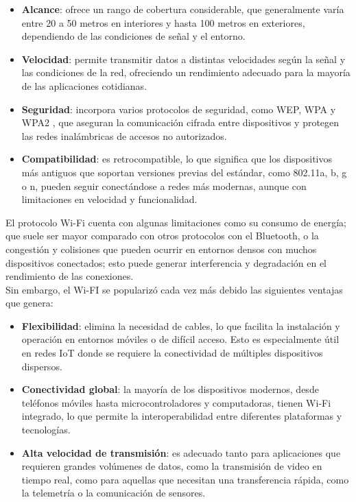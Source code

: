 \begin{itemize}
    \item \textbf{Alcance}: ofrece un rango de cobertura considerable, que generalmente varía entre 20 a 50 metros en interiores y hasta 100 metros en exteriores, dependiendo de las condiciones de señal y el entorno.
    
    \item \textbf{Velocidad}: permite transmitir datos a distintas velocidades según la señal y las condiciones de la red, ofreciendo un rendimiento adecuado para la mayoría de las aplicaciones cotidianas.
    
    \item \textbf{Seguridad}: incorpora varios protocolos de seguridad, como WEP, WPA y WPA2 \cite{wifi_security}, que aseguran la comunicación cifrada entre dispositivos y protegen las redes inalámbricas de accesos no autorizados.
    
    \item \textbf{Compatibilidad}: es retrocompatible, lo que significa que los dispositivos más antiguos que soportan versiones previas del estándar, como 802.11a, b, g o n, pueden seguir conectándose a redes más modernas, aunque con limitaciones en velocidad y funcionalidad.
    
   
\end{itemize}






El protocolo Wi-Fi cuenta con algunas limitaciones como su consumo de energía; que suele ser mayor comparado con otros protocolos con el Bluetooth, o la congestión y colisiones que pueden ocurrir en entornos densos con muchos dispositivos conectados; esto puede generar interferencia y degradación en el rendimiento de las conexiones. \\

Sin embargo, el Wi-FI se popularizó cada vez más debido las siguientes ventajas que genera:

\begin{itemize}
    
    \item \textbf{Flexibilidad}: elimina la necesidad de cables, lo que facilita la instalación y operación en entornos móviles o de difícil acceso. Esto es especialmente útil en redes IoT donde se requiere la conectividad de múltiples dispositivos dispersos.

    
    \item \textbf{Conectividad global}: la mayoría de los dispositivos modernos, desde teléfonos móviles hasta microcontroladores y computadoras, tienen Wi-Fi integrado, lo que permite la interoperabilidad entre diferentes plataformas y tecnologías.

    \item \textbf{Alta velocidad de transmisión}: es adecuado tanto para aplicaciones que requieren grandes volúmenes de datos, como la transmisión de video en tiempo real, como para aquellas que necesitan una transferencia rápida, como la telemetría o la comunicación de sensores.
\end{itemize}



